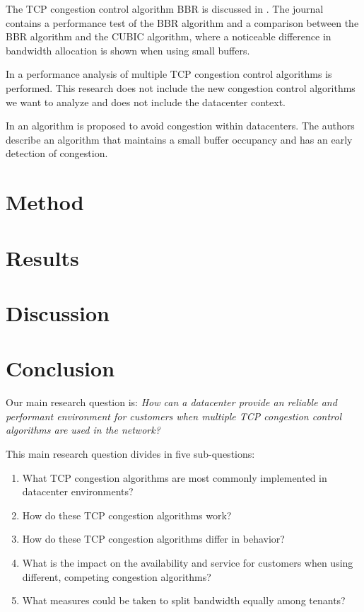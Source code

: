 \documentclass{article}
\begin{document}

The TCP congestion control algorithm BBR is discussed in \cite{bbr-congestion}.
The journal contains a performance test of the BBR algorithm and a comparison
between the BBR algorithm and the CUBIC algorithm, where a noticeable
difference in bandwidth allocation is shown when using small buffers.

In \cite{multiple-congestion} a performance analysis of multiple TCP congestion
control algorithms is performed. This research does not include the new
congestion control algorithms we want to analyze and does not include the
datacenter context.

In \cite{dctcp-congestion-original} an algorithm is proposed to avoid
congestion within datacenters. The authors describe an algorithm that maintains
a small buffer occupancy and has an early detection of congestion.


\section{Method}


\section{Results}


\section{Discussion}


\section{Conclusion}


Our main research question is:
{\it How can a datacenter provide an reliable and performant environment for
customers when multiple TCP congestion control algorithms are used in the
network?}

\vspace{0.5cm}

This main research question divides in five sub-questions:

\begin{enumerate}
	\item What TCP congestion algorithms are most commonly implemented in datacenter environments?
	\item How do these TCP congestion algorithms work?
	\item How do these TCP congestion algorithms differ in behavior?
	\item What is the impact on the availability and service for customers when using different, competing congestion algorithms?
	\item What measures could be taken to split bandwidth equally among tenants?
\end{enumerate}


\end{document}
